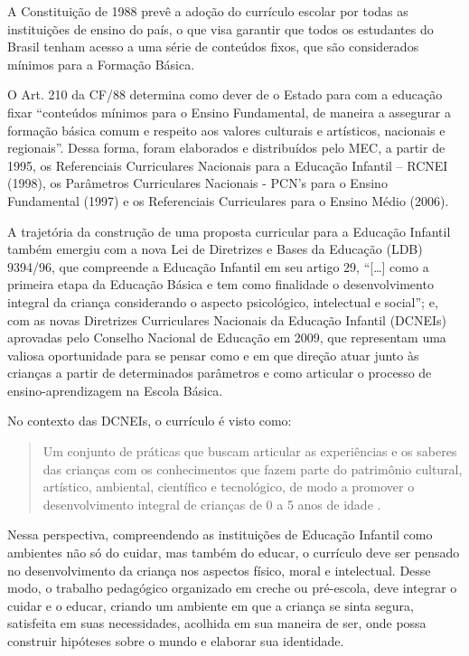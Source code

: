 \begin{refsection}
    A Constituição de 1988 prevê a adoção do currículo escolar por todas as instituições de ensino do país, o que visa garantir que todos os estudantes do Brasil tenham acesso a uma série de conteúdos fixos, que são considerados mínimos para a Formação Básica. 

    O Art. 210 da CF/88 determina como dever de o Estado para com a educação fixar “conteúdos mínimos para o Ensino Fundamental, de maneira a assegurar a formação básica comum e respeito aos valores culturais e artísticos, nacionais e regionais”. Dessa forma, foram elaborados e distribuídos pelo MEC, a partir de 1995, os Referenciais Curriculares Nacionais para a Educação Infantil – RCNEI (1998), os Parâmetros Curriculares Nacionais - PCN’s para o Ensino Fundamental (1997) e os Referenciais Curriculares para o Ensino Médio (2006). 

    A trajetória da construção de uma proposta curricular para a Educação Infantil também emergiu com a nova Lei de Diretrizes e Bases da Educação (LDB) 9394/96, que compreende a Educação Infantil em seu artigo 29, “[\dots] como a primeira etapa da Educação Básica e tem como finalidade o desenvolvimento integral da criança considerando o aspecto psicológico, intelectual e social”; e, com as novas Diretrizes Curriculares Nacionais da Educação Infantil (DCNEIs) aprovadas pelo Conselho Nacional de Educação em 2009, que representam uma valiosa oportunidade para se pensar como e em que direção atuar junto às crianças a partir de determinados parâmetros e como articular o processo de ensino-aprendizagem na Escola Básica. 

    No contexto das DCNEIs, o currículo é visto como:  

    \begin{quotation}
        Um conjunto de práticas que buscam articular as experiências e os saberes das crianças com os conhecimentos que fazem parte do patrimônio cultural, artístico, ambiental, científico e tecnológico, de modo a promover o desenvolvimento integral de crianças de 0 a 5 anos de idade \cite[p.~12]{Resolução5-2009}. 
    \end{quotation}


    Nessa perspectiva, compreendendo as instituições de Educação Infantil como ambientes não só do cuidar, mas também do educar, o currículo deve ser pensado no desenvolvimento da criança nos aspectos físico, moral e intelectual. Desse modo, o trabalho pedagógico organizado em creche ou pré-escola, deve integrar o cuidar e o educar, criando um ambiente em que a criança se sinta segura, satisfeita em suas necessidades, acolhida em sua maneira de ser, onde possa construir hipóteses sobre o mundo e elaborar sua identidade. 


\end{refsection}
